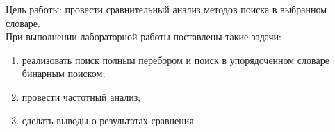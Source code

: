 \Introduction
Цель работы: провести сравнительный анализ методов поиска в выбранном словаре.\\
При выполнении лабораторной работы поставлены такие задачи:
\begin{enumerate}[1)]
	\item реализовать поиск полным перебором и поиск в упорядоченном словаре бинарным поиском;
	\item провести частотный анализ;
	\item сделать выводы о результатах сравнения.
\end{enumerate}